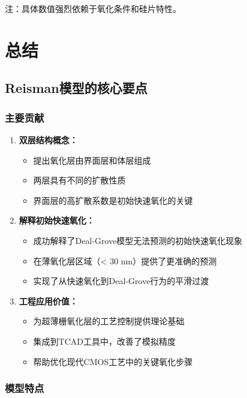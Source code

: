 \documentclass[UTF8,12pt,a4paper]{ctexart}
\begin{document}
注：具体数值强烈依赖于氧化条件和硅片特性。

\newpage
\section{总结}

\subsection{Reisman模型的核心要点}

\subsubsection{主要贡献}

\begin{enumerate}
    \item \textbf{双层结构概念：}
    \begin{itemize}
        \item 提出氧化层由界面层和体层组成
        \item 两层具有不同的扩散性质
        \item 界面层的高扩散系数是初始快速氧化的关键
    \end{itemize}
    
    \item \textbf{解释初始快速氧化：}
    \begin{itemize}
        \item 成功解释了Deal-Grove模型无法预测的初始快速氧化现象
        \item 在薄氧化层区域（< 30 nm）提供了更准确的预测
        \item 实现了从快速氧化到Deal-Grove行为的平滑过渡
    \end{itemize}
    
    \item \textbf{工程应用价值：}
    \begin{itemize}
        \item 为超薄栅氧化层的工艺控制提供理论基础
        \item 集成到TCAD工具中，改善了模拟精度
        \item 帮助优化现代CMOS工艺中的关键氧化步骤
    \end{itemize}
\end{enumerate}

\subsubsection{模型特点}
\end{document}
